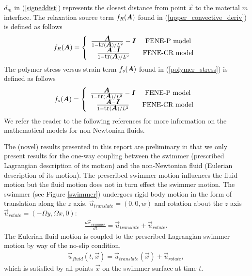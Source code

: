 \documentclass[]{article}
\newcommand{\bmA}{\mbox{\boldmath $A$\unboldmath}}
\newcommand{\bmI}{\mbox{\boldmath $I$\unboldmath}}
\begin{document}
$d_{m}$ in (\ref{signeddist}) represents the closest distance from point 
$\vec{x}$ to the material $m$ interface.  The relaxation source term 
$f_{R}(\bmA)$ found in (\ref{upper_convective_deriv}) is defined as
follows
\begin{eqnarray}
	f_{R}(\bmA)=\left\{ \begin{array}{cc}
		\frac{\bmA}{1-\mbox{tr}(\bmA)/L^{2}}-\bmI &
		\mbox{FENE-P model} \\
		\frac{\bmA-\bmI}{1-\mbox{tr}(\bmA)/L^{2}} &
		                \mbox{FENE-CR model}
	\end{array}
	\right.
\end{eqnarray}
The polymer stress versus strain term $f_{s}(\bmA)$ found in
(\ref{polymer_stress}) is defined as follows
\begin{eqnarray}
	f_{s}(\bmA)=\left\{ \begin{array}{cc}
		\frac{\bmA}{1-\mbox{tr}(\bmA)/L^{2}}-\bmI &
		\mbox{FENE-P model} \\
		\frac{\bmA-\bmI}{1-\mbox{tr}(\bmA)/L^{2}} &
		                \mbox{FENE-CR model}
	\end{array}
	\right.
\end{eqnarray}
We refer the reader to the following references for more information on
the mathematical models for non-Newtonian 
fluids\cite{BIRD1980213,PURNODE19981}.

The (novel) results presented in this report are preliminary in that we only 
present results for the one-way coupling between the 
swimmer (prescribed Lagrangian description of its motion)
and the non-Newtonian fluid (Eulerian description of its motion).  The
prescribed swimmer motion influences the fluid motion but the fluid 
motion does not in turn effect the swimmer motion.  The swimmer (see
Figure \ref{swimmer}) undergoes rigid body motion in the form of
translation along the $z$ axis, $\vec{u}_{translate}=(0,0,w)$ and 
rotation about the $z$ axis $\vec{u}_{rotate}=(-\Omega y,\Omega x,0)$:
\begin{eqnarray}
	\frac{d\vec{x}_{swimmer}}{dt}= 
	\vec{u}_{translate}+\vec{u}_{rotate}.
\end{eqnarray}
The Eulerian fluid motion is coupled to the prescribed Lagrangian
swimmer motion by way of the no-slip condition,
\begin{eqnarray}
	\vec{u}_{fluid}(t,\vec{x})=
	\vec{u}_{translate}(\vec{x})+\vec{u}_{rotate},
\end{eqnarray}
which is satisfied by all points $\vec{x}$ on the swimmer surface at time
$t$.
\end{document}
